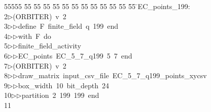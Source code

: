 %
%
\begin{tabbing}
55555 \= 55 \= 55 \= 55 \= 55 \= 55 \= 55 \= 55 \= 55 \= 55 \= 55 \= 55 \= 55 \= \>EC\_points\_199:\\[0pt]
2\>$\triangleright$\>(ORBITER)\ v\ 2\ \\[0pt]
3\>$\triangleright$\>$\triangleright$\>define\ F\ finite\_field\ q\ 199\ end\ \\[0pt]
4\>$\triangleright$\>$\triangleright$\>with\ F\ do\ \\[0pt]
5\>$\triangleright$\>$\triangleright$\>finite\_field\_activity\ \\[0pt]
6\>$\triangleright$\>$\triangleright$\>EC\_points\ EC\_5\_7\_q199\ 5\ 7\ end\\[0pt]
7\>$\triangleright$\>(ORBITER)\ v\ 2\ \\[0pt]
8\>$\triangleright$\>$\triangleright$\>draw\_matrix\ input\_csv\_file\ EC\_5\_7\_q199\_points\_xycsv\ \\[0pt]
9\>$\triangleright$\>$\triangleright$\>box\_width\ 10\ bit\_depth\ 24\ \\[0pt]
10\>$\triangleright$\>$\triangleright$\>partition\ 2\ 199\ 199\ end\\[0pt]
11\>\end{tabbing}

